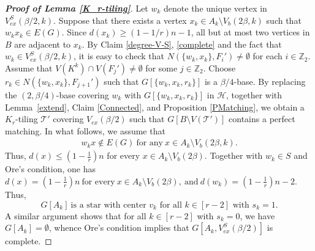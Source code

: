 \documentclass[11pt, a4paper]{article}
\theoremstyle{definition}
\newcommand{\<}{\subseteq}
\begin{document}
\begin{proof}[\bf Proof of Lemma \ref{K_r-tiling}]
 

Let $w_k$ denote the unique vertex in $V_{ex}^S(\beta/2,k)$. 
Suppose that there exists a vertex $x_k\in A_k\setminus V_b(2\beta,k)$ such that $w_kx_k\in E(G)$. Since $d(x_k)\geq (1-1/r)n-1$, all but at most two vertices in $B$ are adjacent to $x_k$. By Claim \ref{degree-V-S}, \eqref{complete}   and the fact that $w_k\in V_{ex}^S(\beta/2,k)$, it is easy to check that $N(\{w_k,x_k\},F_i')\neq \emptyset$ for each $i\in \mathbb{Z}_2$.  Assume that $V(K^k)\cap V(F_j')\neq \emptyset$ for some $j\in \mathbb{Z}_2$. Choose $r_k\in N(\{w_k,x_k\},F_{j+1}')$ such that $G[\{w_k,x_k,r_k\}]$ is a $\beta/4$-base. By replacing the $(2,\beta/4)$-base covering $w_k$ with $G[\{w_k,x_k,r_k\}]$ in $\mathcal{H}$, together with Lemma~\ref{extend}, Claim \ref{Connected}, and Proposition \ref{PMatching}, we obtain a $K_r$-tiling $\mathcal{T}'$ covering $V_{ex}(\beta/2)$ such that $G[B\setminus V(\mathcal{T}')]$ contains a perfect matching. In what follows, we assume that 
\begin{align*}
w_kx\notin E(G) \ \text{for any} \ x\in A_k\setminus V_b(2\beta,k).
\end{align*}
Thus, $d(x)\leq (1- \frac{1}{r})n$ for every $x\in A_k\setminus V_{b}(2\beta)$. Together with $w_k\in S$ and 
Ore's condition, one has 
$d(x)=(1- \frac{1}{r})n\ \text{for every}\ x\in A_k\setminus V_{b}(2\beta),\ \text{and}\ d(w_k)=(1-\frac{1}{r})n-2.$ Thus, 
$$G[A_k] \ \text{is a star with center $v_k$ for all $k\in [r-2]$ with $s_k=1$}.$$ 
A similar argument shows that for all $k \in [r-2]$ with $s_k = 0$, we have $G[A_k] = \emptyset$, whence Ore's condition implies that $G[A_k, V_{ex}^S(\beta/2)]$ is complete. 



\end{proof}
\end{document}
